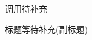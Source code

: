 


\usepackage{amsmath, amssymb, amsthm, mathrsfs, xcolor, hyperref, ctex}


\title{}
\author{Alice}
\date{\today}





调用待补充

标题等待补充(副标题)

